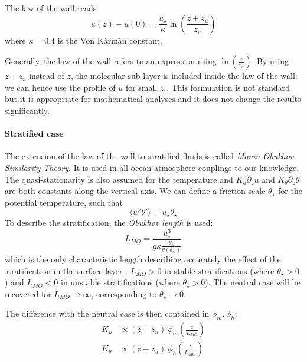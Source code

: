 The law of the wall reads
\begin{equation}
	\label{eq:airseaSCM_LawOfWallProfile}
	u(z) - u(0) = \frac{u_\star}{\kappa} \ln(\frac{z+z_u}{z_u})
\end{equation}
where $\kappa = 0.4$ is the Von Kàrmàn constant.
\begin{remark}
	Generally, the law of the wall
	refers to an expression using
	$\ln(\frac{z}{z_u})$. By using $z+z_u$
	instead of $z$,
	the molecular sub-layer is included
	inside the law of the wall: we can hence
	use the profile of $u$ for small $z$
	\citep{pelletier_two-sided_2021}.
	This formulation is not standard but it is
	appropriate for mathematical analyses and
	it does not change the results
	significantly.
\end{remark}
\paragraph{Stratified case}
The extension of the law of the wall to stratified
fluids is called \textit{Monin-Obukhov Similarity Theory}.
It is used in all ocean-atmosphere couplings to our knowledge.
The quasi-stationarity is also assumed for the temperature
and $K_u \partial_z u$ and $K_\theta \partial_z \theta$
are both constants along the vertical axis.
We can define a friction scale $\theta_\star$
for the potential temperature, such that
\begin{equation}
	\langle w' \theta' \rangle = u_\star \theta_\star
\end{equation}
To describe the stratification, the \textit{Obukhov length}
is used:
\begin{equation}
	L_{MO} = \frac{u_\star^3}{g \kappa
	\frac{\theta_\star}{\theta(\delta_{sl})}}
\end{equation}
which is the only characteristic length describing
accurately the effect of the stratification in
the surface layer \citep{obukhov_turbulence_1946}.
$L_{MO}>0$ in stable stratifications
(where $\theta_\star>0$)
and $L_{MO}<0$ in unstable stratifications
(where $\theta_\star>0$).
The neutral case will be recovered
for $L_{MO} \rightarrow \infty$, corresponding
to $\theta_\star \rightarrow 0$.
\par
The difference with the neutral case is then contained
in  $\phi_m, \phi_h$:
\begin{equation}
\begin{aligned}
	K_u &\propto (z+z_u)~ \phi_m(\frac{z}{L_{MO}}) \\
	K_\theta &\propto (z+z_u)~ \phi_h(\frac{z}{L_{MO}})
\end{aligned}
\end{equation}
